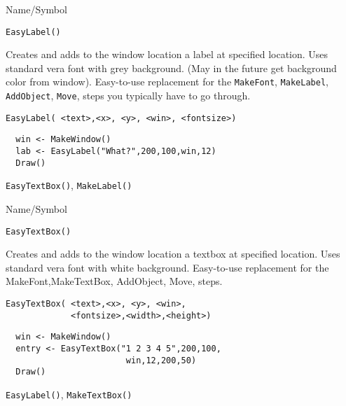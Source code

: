 \vfill
\newpage
{}
\vfill

\begin{desc}{Name/Symbol}
\item[Name/Symbol]	\verb+EasyLabel()+

\item[Description] Creates and adds to the window location a label
  at specified location. Uses standard vera font with grey background.
   (May in the future get background color from window).
  Easy-to-use replacement for the \verb+MakeFont+, \verb+MakeLabel+,
  \verb+AddObject+, \verb+Move+, steps you typically have to go through.

\item[Usage]
\begin{verbatim}
EasyLabel( <text>,<x>, <y>, <win>, <fontsize>)
\end{verbatim}

\item[Example]	
\begin{verbatim}
  win <- MakeWindow()
  lab <- EasyLabel("What?",200,100,win,12)
  Draw()
\end{verbatim}
\item[See Also]	
\verb+EasyTextBox()+, \verb+MakeLabel()+
\end{desc}




\begin{desc}{Name/Symbol}
\item[Name/Symbol]	\verb+EasyTextBox()+

\item[Description] Creates and adds to the window location a textbox
  at specified location. Uses standard vera font with white background.
  Easy-to-use replacement for the MakeFont,MakeTextBox,
  AddObject, Move, steps.

\item[Usage]
\begin{verbatim}
EasyTextBox( <text>,<x>, <y>, <win>,
             <fontsize>,<width>,<height>)
\end{verbatim}

\item[Example]	
\begin{verbatim}
  win <- MakeWindow()
  entry <- EasyTextBox("1 2 3 4 5",200,100,
                        win,12,200,50)
  Draw()
\end{verbatim}
\item[See Also]	
\verb+EasyLabel()+, \verb+MakeTextBox()+
\end{desc}



